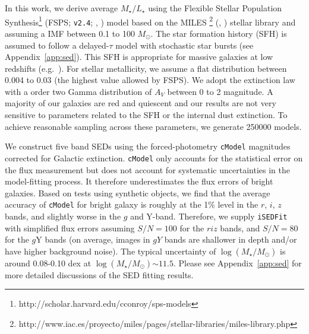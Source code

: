 \documentclass{emulateapj}
\def\msun{$M_\odot$}
\def\cmodel{\texttt{cModel}}
\def\logms{{$\log (M_{\star}/M_{\odot})$}}
\def\m2l{{$M_{\star}/L_{\star}$}}
\begin{document}
\begin{CJK*}{UTF8}{gbsn}
    In this work, we derive average \m2l{} using the Flexible Stellar Population 
    Synthesis\footnote{http://scholar.harvard.edu/cconroy/sps-models}
    (FSPS; \texttt{v2.4}; \citealt{FSPS}, \citealt{Conroy2010}) model based on the MILES
    \footnote{http://www.iac.es/proyecto/miles/pages/stellar-libraries/miles-library.php}
    (\citealt{MILES1}, \citealt{MILES2}) stellar library and assuming a
    \citet{Chabrier2003} IMF between 0.1 to 100 \msun. 
    The star formation history (SFH) is assumed to follow a delayed-$\tau$ model with 
    stochastic star bursts (see Appendix~\ref{app:sed}). 
    This SFH is appropriate for massive galaxies at low redshifts 
    (e.g.\ \citealt{Kauffmann2003}). 
    For stellar metallicity, we assume a flat distribution between 0.004 to 0.03 
    (the highest value allowed by FSPS). 
    We adopt the \citet{Calzetti2000} extinction law with a order two Gamma distribution 
    of $A_{V}$ between 0 to 2 magnitude. 
    A majority of our galaxies are red and quiescent and our results are 
    not very sensitive to parameters related to the SFH or the internal dust extinction. 
    To achieve reasonable sampling across these parameters, we generate 250000 models. 
    
    We construct five band SEDs using the forced-photometry \cmodel{} magnitudes 
    corrected for Galactic extinction. 
    \cmodel{} only accounts for the statistical error on the flux measurement but does
    not account for systematic uncertainties in the model-fitting process. 
    It therefore underestimates the flux errors of bright galaxies. 
    Based on tests using synthetic objects, we find that the average accuracy of
    \cmodel{} for bright galaxy is roughly at the 1\% level in the $r$, $i$, $z$ bands, 
    and slightly worse in the $g$ and Y-band. 
    Therefore, we supply \texttt{iSEDFit} with simplified flux errors assuming 
    $S/N = 100$ for the $riz$ bands, and $S/N = 80$ for the $g$Y bands (on average, 
    images in $gY$ bands are shallower in depth and/or have higher background noise).  
    The typical uncertainty of \logms{} is around 0.08-0.10 dex at \logms$\sim 11.5$. 
    Please see Appendix~\ref{app:sed} for more detailed discussions of the SED fitting
    results.  


\end{CJK*}
\end{document}
